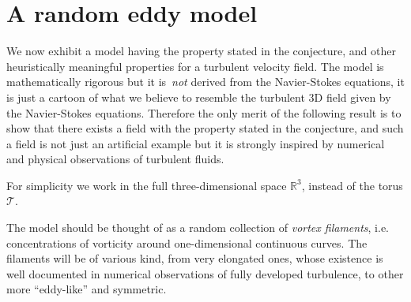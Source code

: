 \documentclass[11pt]{preprint}
\newtheorem{problem}[theorem]{Problem}
\begin{document}

\section{A random eddy model}
\label{sec:Eddy}

We now exhibit a model having the property stated in the conjecture, and other
heuristically meaningful properties for a turbulent velocity field. The model
is mathematically rigorous but it is~\textit{not} derived from the
Navier-Stokes equations, it is just a cartoon of what we believe to resemble the
turbulent 3D field given by the Navier-Stokes equations. Therefore the only
merit of the following result is to show that there exists a field with the
property stated in the conjecture, and such a field is not just an artificial
example but it is strongly inspired by numerical and physical observations of
turbulent fluids.

\medskip For simplicity we work in the full three-dimensional space
$\mathbb{R}^{3}$, instead of the torus $\mathcal{T}$.

The model should be thought of as a random collection of \emph{vortex filaments},
i.e. concentrations of vorticity around one-dimensional continuous curves. The
filaments will be of various kind, from very elongated ones, whose existence
is well documented in numerical observations of fully developed turbulence, to
other more ``eddy-like'' and symmetric.
\end{document}
